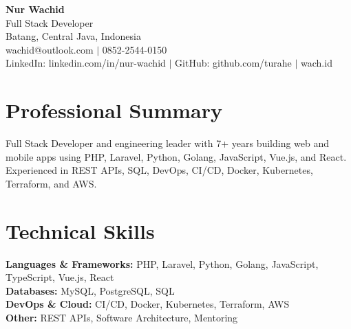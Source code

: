 \begin{center}
  {\LARGE\bfseries Nur Wachid}\\[3pt]
  Full Stack Developer\\[2pt]
  Batang, Central Java, Indonesia\\[2pt]
  wachid@outlook.com $|$ 0852-2544-0150\\[1pt]
  LinkedIn: linkedin.com/in/nur-wachid $|$ GitHub: github.com/turahe $|$ wach.id
\end{center}
\section*{Professional Summary}
Full Stack Developer and engineering leader with 7+ years building web and mobile apps using PHP, Laravel, Python, Golang, JavaScript, Vue.js, and React. Experienced in REST APIs, SQL, DevOps, CI/CD, Docker, Kubernetes, Terraform, and AWS.
\section*{Technical Skills}
\textbf{Languages \& Frameworks:} PHP, Laravel, Python, Golang, JavaScript, TypeScript, Vue.js, React\\[1pt]
\textbf{Databases:} MySQL, PostgreSQL, SQL\\[1pt]
\textbf{DevOps \& Cloud:} CI/CD, Docker, Kubernetes, Terraform, AWS\\[1pt]
\textbf{Other:} REST APIs, Software Architecture, Mentoring
